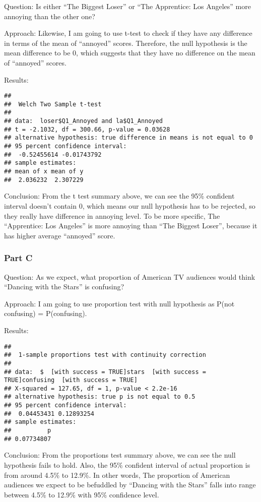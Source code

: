 \documentclass[
]{article}
\begin{document}
Question: Is either ``The Biggest Loser'' or ``The Apprentice: Los Angeles'' more annoying than the other one?

Approach: Likewise, I am going to use t-test to check if they have any difference in terms of the mean of ``annoyed'' scores. Therefore, the null hypothesis is the mean difference to be 0, which suggests that they have no difference on the mean of ``annoyed'' scores.

Results:

\begin{verbatim}
## 
##  Welch Two Sample t-test
## 
## data:  loser$Q1_Annoyed and la$Q1_Annoyed
## t = -2.1032, df = 300.66, p-value = 0.03628
## alternative hypothesis: true difference in means is not equal to 0
## 95 percent confidence interval:
##  -0.52455614 -0.01743792
## sample estimates:
## mean of x mean of y 
##  2.036232  2.307229
\end{verbatim}

Conclusion: From the t test summary above, we can see the 95\% confident interval doesn't contain 0, which means our null hypothesis has to be rejected, so they really have difference in annoying level. To be more specific, The ``Apprentice: Los Angeles'' is more annoying than ``The Biggest Loser'', because it has higher average ``annoyed'' score.

\hypertarget{part-c-4}{%
\subsubsection{Part C}\label{part-c-4}}

Question: As we expect, what proportion of American TV audiences would think ``Dancing with the Stars'' is confusing?

Approach: I am going to use proportion test with null hypothesis as P(not confusing) = P(confusing).

Results:

\begin{verbatim}
## 
##  1-sample proportions test with continuity correction
## 
## data:  $  [with success = TRUE]stars  [with success = TRUE]confusing  [with success = TRUE]
## X-squared = 127.65, df = 1, p-value < 2.2e-16
## alternative hypothesis: true p is not equal to 0.5
## 95 percent confidence interval:
##  0.04453431 0.12893254
## sample estimates:
##          p 
## 0.07734807
\end{verbatim}

Conclusion: From the proportions test summary above, we can see the null hypothesis fails to hold. Also, the 95\% confident interval of actual proportion is from around 4.5\% to 12.9\%. In other words, The proportion of American audiences we expect to be befuddled by ``Dancing with the Stars'' falls into range between 4.5\% to 12.9\% with 95\% confidence level.
\end{document}
